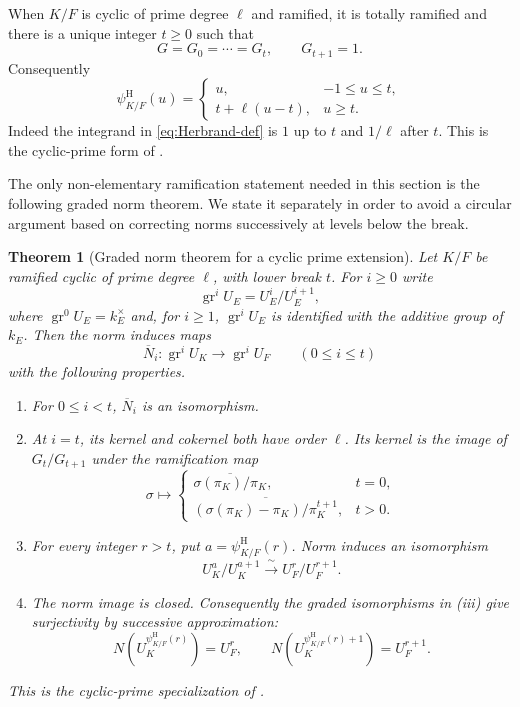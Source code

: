 \documentclass[11pt]{amsart}
\newtheorem{theorem}{Theorem}[section]
\theoremstyle{definition}
\theoremstyle{remark}
\newcommand{\HerbPsi}{\psi^{\mathrm H}}
\begin{document}
When $K/F$ is cyclic of prime degree $\ell$ and ramified, it is totally
ramified and there is a unique integer $t\geq0$ such that
\begin{equation}\label{eq:one-break-new}
 G=G_0=\cdots=G_t,\qquad G_{t+1}=1.
\end{equation}
Consequently
\begin{equation}\label{eq:Herbrand-prime-new}
 \HerbPsi_{K/F}(u)=
 \begin{cases}
 u,&-1\leq u\leq t,\\
 t+\ell(u-t),&u\geq t.
 \end{cases}
\end{equation}
Indeed the integrand in \eqref{eq:Herbrand-def} is $1$ up to $t$ and
$1/\ell$ after $t$.  This is the cyclic-prime form of \cite[Lemma 6.3, p.~29]{Langlands}.

The only non-elementary ramification statement needed in this section
is the following graded norm theorem.  We state it separately in order
to avoid a circular argument based on correcting norms successively at
levels below the break.

\begin{theorem}[Graded norm theorem for a cyclic prime extension]
\label{thm:graded-norm}
Let $K/F$ be ramified cyclic of prime degree $\ell$, with lower break
$t$.  For $i\ge0$ write
\[
 \operatorname{gr}^iU_E=U_E^i/U_E^{i+1},
\]
where $\operatorname{gr}^0U_E=k_E^\times$ and, for $i\ge1$,
$\operatorname{gr}^iU_E$ is identified with the additive group of
$k_E$.  Then the norm induces maps
\[
 \overline N_i:\operatorname{gr}^iU_K\longrightarrow
                   \operatorname{gr}^iU_F\qquad(0\le i\le t)
\]
with the following properties.
\begin{enumerate}[label=(\roman*)]
\item For $0\le i<t$, $\overline N_i$ is an isomorphism.
\item At $i=t$, its kernel and cokernel both have order $\ell$.  Its
      kernel is the image of $G_t/G_{t+1}$ under the ramification map
\[
 \sigma\longmapsto
 \begin{cases}
  \overline{\sigma(\pi_K)/\pi_K},&t=0,\\[1mm]
  \overline{(\sigma(\pi_K)-\pi_K)/\pi_K^{t+1}},&t>0.
 \end{cases}
\]
\item For every integer $r>t$, put
      $a=\HerbPsi_{K/F}(r)$.  Norm induces an isomorphism
\[
 U_K^a/U_K^{a+1}\xrightarrow{\ \sim\ }
 U_F^r/U_F^{r+1}.
\]
\item The norm image is closed.  Consequently the graded
      isomorphisms in (iii) give surjectivity by successive approximation:
\[
 N(U_K^{\HerbPsi_{K/F}(r)})=U_F^r,
 \qquad
 N(U_K^{\HerbPsi_{K/F}(r)+1})=U_F^{r+1}.
\]
\end{enumerate}
This is the cyclic-prime specialization of
\cite[Chapter~V, \S3, Propositions~4--5 and Corollaries~1--3]{Serre}.
\end{theorem}
\end{document}
